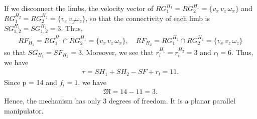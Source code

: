 If we disconnect the limbs, the velocity vector of $RG_1^{H_1} = RG_2^{H_1} = \{v_x \, v_z \, \omega_x\}$ and $RG_1^{H_2} = RG_2^{H_2} = \{v_x \, v_y \omega_z \}$, so that the connectivity of each limb is $SG_{1,2}^{H_1} = SG_{1,2}^{H_2} = 3$. Thus,
%
\begin{align}
	RF_{H_1} = RG_1^{H_1} \cap RG_2^{H_1} = \{ v_x \, v_z \, \omega_x\}, \quad RF_{H_2} = RG_1^{H_2} \cap RG_2^{H_2} = \{ v_x \, v_z \, \omega_z\}
\end{align}
%
so that $SG_{H_1} = SF_{H_2} = 3$.
%
Moreover, we see that $r_l^{H_1} = r_l^{H_2} = 3$ and $r_l = 6$. Thus, we have
%
\begin{align}
	r = SH_1 + SH_2 - SF + r_l = 11.
\end{align}
%
Since p = 14 and $f_i = 1$, we have 
%
\begin{align}
	\mathfrak{M} = 14 - 11 = 3. 
\end{align}
%
Hence, the mechanism has only 3 degrees of freedom. It is a planar parallel manipulator.
